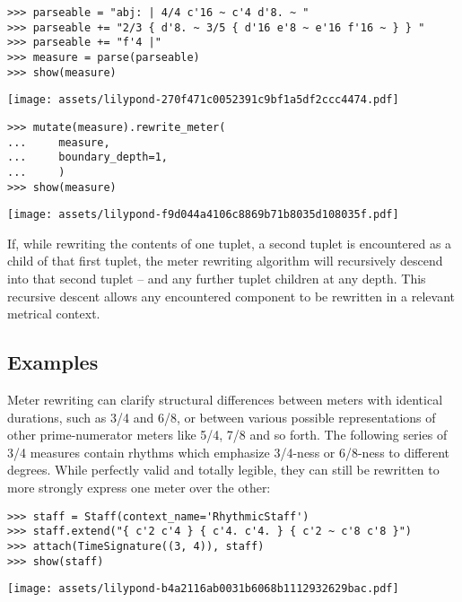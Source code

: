 \begin{abjadbookoutput}
\begin{singlespacing}
\vspace{-0.5\baselineskip}
\begin{lstlisting}
>>> parseable = "abj: | 4/4 c'16 ~ c'4 d'8. ~ "
>>> parseable += "2/3 { d'8. ~ 3/5 { d'16 e'8 ~ e'16 f'16 ~ } } "
>>> parseable += "f'4 |"
>>> measure = parse(parseable)
>>> show(measure)
\end{lstlisting}
\noindent\texttt{[image: assets/lilypond-270f471c0052391c9bf1a5df2ccc4474.pdf]}
\begin{lstlisting}
>>> mutate(measure).rewrite_meter(
...     measure,
...     boundary_depth=1,
...     )
>>> show(measure)
\end{lstlisting}
\noindent\texttt{[image: assets/lilypond-f9d044a4106c8869b71b8035d108035f.pdf]}
\end{singlespacing}
\end{abjadbookoutput}

\noindent If, while rewriting the contents of one tuplet, a second tuplet is
encountered as a child of that first tuplet, the meter rewriting algorithm will
recursively descend into that second tuplet -- and any further tuplet children
at any depth. This recursive descent allows any encountered component to be
rewritten in a relevant metrical context.

\subsection{Examples}

Meter rewriting can clarify structural differences between meters with
identical durations, such as 3/4 and 6/8, or between various possible
representations of other prime-numerator meters like 5/4, 7/8 and so forth.
The following series of 3/4 measures contain rhythms which emphasize 3/4-ness
or 6/8-ness to different degrees. While perfectly valid and totally legible,
they can still be rewritten to more strongly express one meter over the other:

\begin{comment}
<abjad>
staff = Staff(context_name='RhythmicStaff')
staff.extend("{ c'2 c'4 } { c'4. c'4. } { c'2 ~ c'8 c'8 }")
attach(TimeSignature((3, 4)), staff)
show(staff)
</abjad>
\end{comment}

\begin{abjadbookoutput}
\begin{singlespacing}
\vspace{-0.5\baselineskip}
\begin{lstlisting}
>>> staff = Staff(context_name='RhythmicStaff')
>>> staff.extend("{ c'2 c'4 } { c'4. c'4. } { c'2 ~ c'8 c'8 }")
>>> attach(TimeSignature((3, 4)), staff)
>>> show(staff)
\end{lstlisting}
\noindent\texttt{[image: assets/lilypond-b4a2116ab0031b6068b1112932629bac.pdf]}
\end{singlespacing}
\end{abjadbookoutput}

